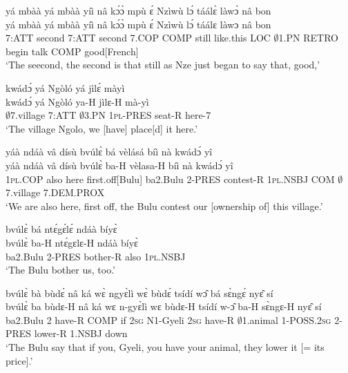 \begin{exe} 
\exC\label{102} 
  \glll  yá mbàà yá mbàà yíì nâ kɔ́ɔ̀ mpù ɛ́ Nzìwù lɔ́ táálɛ̀ làwɔ̀ nâ bon \\
         yá mbàà yá mbàà yíì nâ kɔ́ɔ̀ mpù ɛ́ Nzìwù lɔ́ táálɛ làwɔ nâ bon \\
         7:ATT second 7:ATT second 7.COP COMP still like.this LOC $\emptyset$1.PN RETRO begin talk COMP good[French]   \\
    \trans `The seecond, the second is that still as Nze just began to say that, good,'
\end{exe}

\begin{exe} 
\exC\label{103}
  \glll  kwádɔ́ yá Ngòló yá jìlɛ́ màyì \\
        kwádɔ́ yá Ngòló ya-H jìlɛ-H mà-yì \\
          $\emptyset$7.village 7:ATT $\emptyset$3.PN 1\textsc{pl}-PRES seat-R here-7  \\
    \trans `The village Ngolo, we [have] place[d] it here.'
\end{exe}

\begin{exe} 
\exC\label{104}
  \glll  yáà ndáà vâ dísù bvúlɛ̀ bá vèlásá bíì nà kwádɔ́ yî \\
        yáà ndáà vâ dísù bvúlɛ̀ ba-H vèlasa-H bíì nà kwádɔ́ yî \\
          1\textsc{pl}.COP also here first.off[Bulu] ba2.Bulu 2-PRES contest-R 1\textsc{pl}.NSBJ COM $\emptyset$7.village 7.DEM.PROX  \\
    \trans `We are also here, first off, the Bulu contest our [ownership of] this village.'
\end{exe}

\begin{exe} 
\exC\label{105} 
  \glll bvúlɛ̀ bá ntɛ́gɛ́lɛ́ ndáà bíyɛ̀ \\
       bvúlɛ̀ ba-H ntɛ́gɛlɛ-H ndáà bíyɛ̀ \\
         ba2.Bulu 2-PRES bother-R also 1\textsc{pl}.NSBJ   \\
    \trans `The Bulu bother us, too.'
\end{exe}

\begin{exe} 
\exC\label{106}
  \glll bvúlɛ̀ bà bùdɛ́ nâ ká wɛ̀ ngyɛ̀lì wɛ̀ bùdɛ́ tsídí wɔ̂ bá sɛ̀ngɛ́ nyɛ̂ sí \\
        bvúlɛ̀ ba bùdɛ-H nâ ká wɛ n-gyɛ̀lì wɛ bùdɛ-H tsídí w-ɔ̂ ba-H sɛ̀ngɛ-H nyɛ̂ sí \\
          ba2.Bulu 2 have-R COMP if 2\textsc{sg} N1-Gyeli 2\textsc{sg} have-R $\emptyset$1.animal 1-POSS.2\textsc{sg} 2-PRES lower-R 1.NSBJ down   \\
    \trans `The Bulu say that if you, Gyeli, you have your animal, they lower it [= its price].'
\end{exe}

